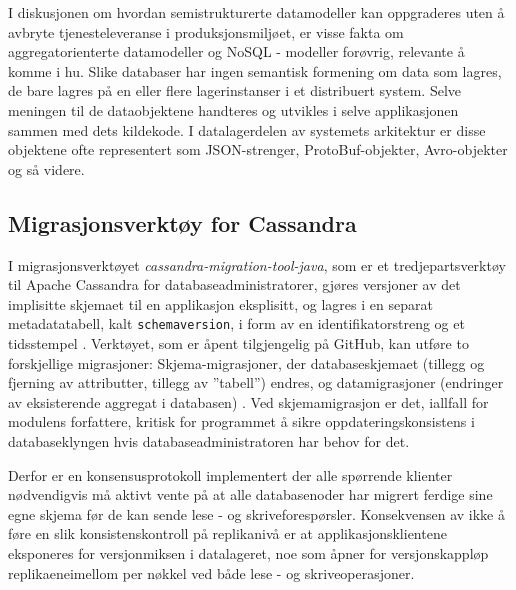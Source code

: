 I diskusjonen om hvordan semistrukturerte datamodeller kan oppgraderes uten å avbryte tjenesteleveranse i produksjonsmiljøet, er visse fakta om aggregatorienterte datamodeller og NoSQL - modeller forøvrig, relevante å komme i hu. Slike databaser har ingen semantisk formening om data som lagres, de bare lagres på en eller flere lagerinstanser i et distribuert system. Selve meningen til de dataobjektene handteres og utvikles i selve applikasjonen sammen med dets kildekode. I datalagerdelen av systemets arkitektur er disse objektene ofte representert som JSON-strenger, ProtoBuf-objekter, Avro-objekter og så videre.


\subsection{Migrasjonsverktøy for Cassandra}

I migrasjonsverktøyet \emph{cassandra-migration-tool-java}, som er et tredjepartsverktøy til Apache Cassandra for databaseadministratorer, gjøres versjoner av det implisitte skjemaet til en applikasjon eksplisitt, og lagres i en separat metadatatabell, kalt \texttt{schema\textunderscore version}, i form av en identifikatorstreng og et tidsstempel \citep{bozic2015}. Verktøyet, som er åpent tilgjengelig på GitHub, kan utføre to forskjellige migrasjoner: Skjema-migrasjoner, der databaseskjemaet (tillegg og fjerning av attributter, tillegg av ''tabell'') endres, og datamigrasjoner (endringer av eksisterende aggregat i databasen) \citep{bozic2015}. Ved skjemamigrasjon er det, iallfall for modulens forfattere, kritisk for programmet å sikre oppdateringskonsistens i databaseklyngen hvis databaseadministratoren har behov for det. 

Derfor er en konsensusprotokoll implementert der alle spørrende klienter nødvendigvis må aktivt vente på at alle databasenoder har migrert ferdige sine egne skjema før de kan sende lese - og skriveforespørsler. Konsekvensen av ikke å føre en slik konsistenskontroll på replikanivå er at applikasjonsklientene eksponeres for versjonmiksen i datalageret, noe som åpner for versjonskappløp replikaeneimellom per nøkkel ved både lese - og skriveoperasjoner.
